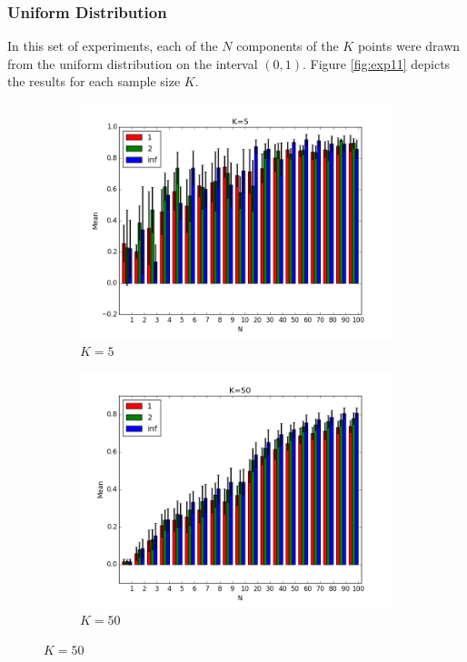 \documentclass{article}
\begin{document}
\subsubsection{Uniform Distribution}
In this set of experiments, each of the $N$ components of the $K$ points were drawn from the uniform distribution on the interval $(0,1)$. Figure \ref{fig:exp11} depicts the results for each sample size $K$.
\begin{figure}[H]
    \centering
    \begin{subfigure}[h]{0.45\textwidth}
        \includegraphics[width=\textwidth]{l-experiment1-1-5-inf.png}
        \caption{$K=5$}
        \label{fig:exp1k5}
    \end{subfigure}
   \begin{subfigure}[h]{0.45\textwidth}
        \includegraphics[width=\textwidth]{l-experiment1-1-50-inf.png}
        \caption{$K=50$}
        \label{fig:exp11k50}
    \end{subfigure}
\end{figure}
\end{document}
